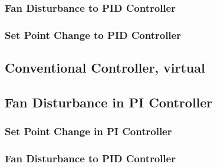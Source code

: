 \subsubsection{Fan Disturbance to PID Controller}
\begin{code}

\end{code}

\subsubsection{Set Point Change to PID Controller}
\begin{code}

\end{code}






\subsection{Conventional Controller, virtual}\label{convcode_virtual}
\subsection{Fan Disturbance in PI Controller}
\begin{code}

\end{code}


\subsubsection{Set Point Change in PI Controller}
\begin{code}

\end{code}



\subsubsection{Fan Disturbance to PID Controller}
\begin{code}

\end{code}


